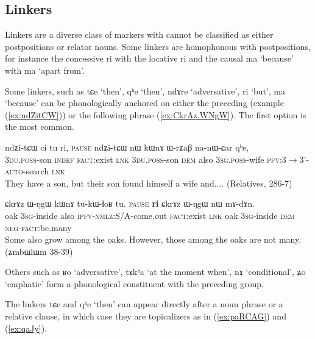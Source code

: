 \documentclass[oldfontcommands,oneside,a4paper,11pt]{article}
\newcommand{\ipa}[1]{{\phon \mbox{#1}}} %
\newcommand{\refb}[1]{(\ref{#1})}
\begin{document}
\subsection{Linkers} \label{sec:linkers}
Linkers are a diverse class of markers with cannot be classified as either postpositions or relator nouns.   Some linkers are homophonous with postpositions, for instance the concessive \ipa{ri} with the locative \ipa{ri} and the causal \ipa{ma} `because' with \ipa{ma} `apart from'.

Some linkers, such as    \ipa{tɕe}  `then', \ipa{qʰe} `then', \ipa{ndɤre} `adversative', \ipa{ri} `but', \ipa{ma}  `because' can be phonologically anchored on either the preceding (example \refb{ex:ndZitCW}) or the following phrase \refb{ex:CkrAz.WNgW}. The first option is the most common.  
 \begin{exe}
\ex \label{ex:ndZitCW} 
\gll
\ipa{ndʑi-tɕɯ}   	\ipa{ci}   	\ipa{tu}   	\ipa{ri,}  \textsc{pause} 	\ipa{ndʑi-tɕɯ}   	\ipa{nɯ}   	\ipa{kɯnɤ}   	\ipa{ɯ-rʑaβ}   	\ipa{na-nɯ-ɕar}   	\ipa{qʰe,}   \\
\textsc{3du.poss}-son \textsc{indef} \textsc{fact}:exist \textsc{lnk} {  } \textsc{3du.poss}-son  \textsc{dem} also \textsc{3sg.poss}-wife \textsc{pfv}:3$\rightarrow$3'-\textsc{auto}-search \textsc{lnk} \\
\glt They have a son, but their son found himself a wife and.... (Relatives, 286-7)
\end{exe}
 \begin{exe}
\ex \label{ex:CkrAz.WNgW} 
\gll
\ipa{ɕkrɤz}   	\ipa{ɯ-ŋgɯ}   	\ipa{kɯnɤ}   	\ipa{tu-kɯ-ɬoʁ}   	\ipa{tu.}   \textsc{pause}	\ipa{\textbf{ri}}   	\ipa{ɕkrɤz}   	\ipa{ɯ-ŋgɯ}   	\ipa{nɯ}   	\ipa{mɤ-dɤn.}   \\
oak \textsc{3sg}-inside  also \textsc{ipfv-nmlz}:S/A-come.out \textsc{fact}:exist {  } \textsc{lnk} oak \textsc{3sg}-inside \textsc{dem} \textsc{neg-fact}:be.many \\
\glt Some also grow among the oaks. However, those among the oaks are not many. (ʑmbɯlɯm 38-39)
\end{exe}

Others such as \ipa{ʁo} `adversative', \ipa{tɤkʰa} `at the moment when', \ipa{nɤ} `conditional', \ipa{ʑo} `emphatic' form a phonological constituent with the preceding group.

The linkers   \ipa{tɕe} and \ipa{qʰe} `then'  can appear directly after a noun phrase or a relative clause, in which case they are topicalizers as in \refb{ex:paRCAG} and \refb{ex:qaJy}.
\end{document}

